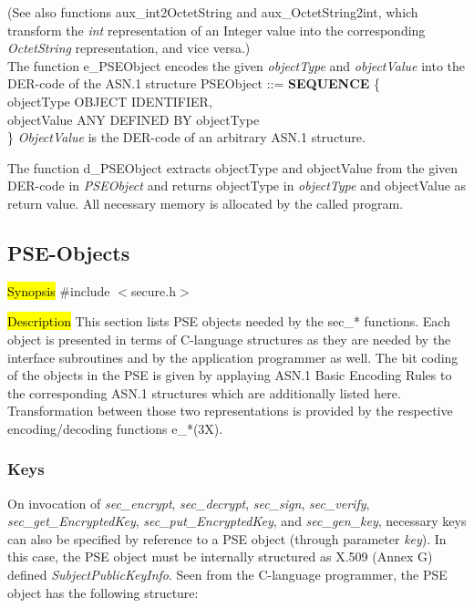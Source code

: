 (See also functions aux\_int2OctetString and aux\_OctetString2int, which transform the 
{\em int} representation of an Integer value into the corresponding {\em OctetString} representation,
and vice versa.)
\\ [1em]
The function e\_PSEObject encodes the given {\em objectType} and {\em objectValue} into the
DER-code of the ASN.1 structure
\bc
{\small
\bvtab
PSEObject ::= \3 {\bf SEQUENCE} \{ \\
\5 objectType \3 OBJECT IDENTIFIER, \\
\5 objectValue \3 ANY DEFINED BY objectType \\
\3 \}
\evtab
}
\ec
{\em ObjectValue} is the DER-code of an arbitrary ASN.1 structure. 

The function d\_PSEObject extracts objectType and objectValue from the given
DER-code in {\em PSEObject} and returns objectType in {\em objectType} and
objectValue as return value. All necessary memory is allocated by the 
called program.

\subsection{PSE-Objects}
\label{sec-sw-cc}
\hl{Synopsis}
\#include $<$secure.h$>$ 

\hl{Description}     
This section lists PSE objects needed by the sec\_* functions. Each object is presented in terms
of C-language structures as they are needed by the interface subroutines and
by the application programmer as well. The bit coding of the objects in the PSE
is given by applaying ASN.1 Basic Encoding Rules to the corresponding ASN.1 structures which
are additionally listed here.
Transformation between those two representations
is provided by the respective encoding/decoding functions e\_*(3X).

\subsubsection{Keys}
On invocation of {\em sec\_encrypt}, {\em sec\_decrypt}, {\em sec\_sign}, {\em sec\_verify},
{\em sec\_get\_EncryptedKey}, {\em sec\_put\_EncryptedKey}, and {\em sec\_gen\_key}, necessary
keys can also be specified by reference to a PSE object (through parameter {\em key}). In this
case, the PSE object must be internally structured as X.509 (Annex G) defined
{\em SubjectPublicKeyInfo}. Seen from the C-language programmer, the PSE object 
has the following structure:
       
